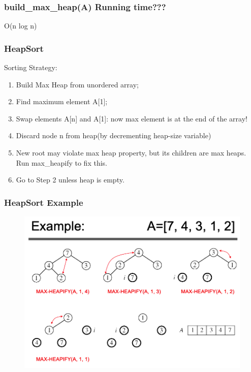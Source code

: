 \documentclass[11pt]{beamer}
\begin{document}
\begin{frame}
	\frametitle	{build\_max\_heap(A) Running time???} 
	\pause O(n log n)
\end{frame}


\begin{frame}
	\frametitle	{HeapSort} 
	Sorting Strategy:
    \begin{enumerate}
    	\item Build Max Heap from unordered array;
    	\item  Find maximum element A[1];
    	\item Swap elements A[n] and A[1]: now max element is at the end of the array!
    	\item Discard node n from heap(by decrementing heap-size variable)
    	\item New root may violate max heap property, but its children are max heaps. Run max\_heapify to fix this.
    	\item Go to Step 2 unless heap is empty.
    \end{enumerate}
\end{frame}

\begin{frame}
	\frametitle	{HeapSort Example} 
	\begin{figure}
		\centering
		\includegraphics[width=1\linewidth]{"Screenshot 2020-12-23 at 9.42.04 PM"}
		\label{fig:screenshot-2020-12-23-at-9}
	\end{figure}
	
\end{frame}
\end{document}
